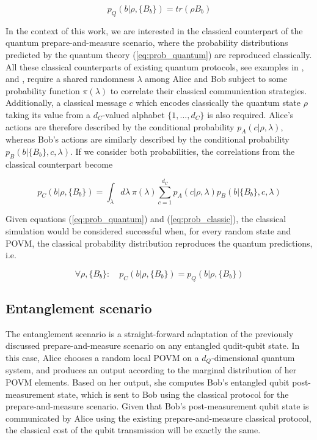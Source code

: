\begin{equation}\label{eq:prob_quantum}
p_Q(b|\rho,\{B_b\}) = tr(\rho B_b)
\end{equation}

In the context of this work, we are interested in the classical counterpart of the quantum prepare-and-measure scenario, where the probability distributions predicted by the quantum theory (\ref{eq:prob_quantum}) are reproduced classically. All these classical counterparts of existing quantum protocols, see examples in \cite{cerf2000}, \cite{toner2003} and \cite{renner2022}, require a shared randomness $\lambda$ among Alice and Bob subject to some probability function $\pi(\lambda)$ to correlate their classical communication strategies. Additionally, a classical message $c$ which encodes classically the quantum state $\rho$ taking its value from a $d_C$-valued alphabet $\{1,...,d_C\}$ is also required. Alice's actions are therefore described by the conditional probability $p_A(c|\rho,\lambda)$, whereas Bob's actions are similarly described by the conditional probability $p_B(b|\{B_b\},c,\lambda)$. If we consider both probabilities, the correlations from the classical counterpart become

\begin{equation}\label{eq:prob_classic}
p_C(b|\rho,\{B_b\}) = \int_{\lambda} d\lambda\ \pi(\lambda) \sum_{c=1}^{d_C} p_A(c|\rho, \lambda) p_B(b|\{B_b\}, c, \lambda)
\end{equation}

Given equations (\ref{eq:prob_quantum}) and (\ref{eq:prob_classic}), the classical simulation would be considered successful when, for every random state and POVM, the classical probability distribution reproduces the quantum predictions, i.e.

\begin{equation}
\forall \rho, \{B_b\}:\quad p_C(b|\rho,\{B_b\}) = p_Q(b|\rho,\{B_b\})
\end{equation}

\subsection{Entanglement scenario}
The entanglement scenario is a straight-forward adaptation of the previously discussed prepare-and-measure scenario on any entangled qudit-qubit state. In this case, Alice chooses a random local POVM on a $d_Q$-dimensional quantum system, and produces an output according to the marginal distribution of her POVM elements. Based on her output, she computes Bob's entangled qubit post-measurement state, which is sent to Bob using the classical protocol for the prepare-and-measure scenario. Given that Bob's post-measurement qubit state is communicated by Alice using the existing prepare-and-measure classical protocol, the classical cost of the qubit transmission will be exactly the same.

